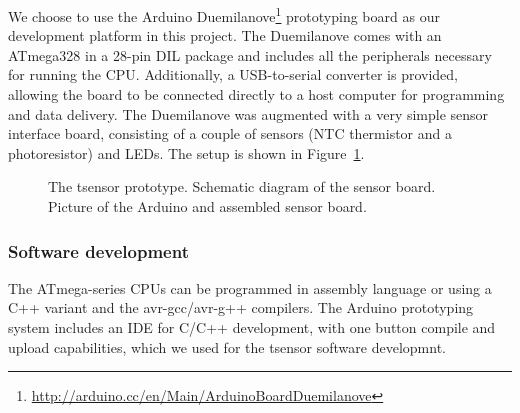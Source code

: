 We choose to use the Arduino Duemilanove\footnote{\url{http://arduino.cc/en/Main/ArduinoBoardDuemilanove}} prototyping board as our development platform in this project. The Duemilanove comes with an ATmega328 in a  28-pin DIL package and includes all the peripherals necessary for running the CPU. Additionally, a USB-to-serial converter is provided, allowing the board to be connected directly to a host computer for programming and data delivery.
%
The Duemilanove was augmented with a very simple sensor interface board, consisting of a couple of sensors (NTC thermistor and a photoresistor) and LEDs. The setup is shown in Figure~\ref{fig:tsensor}.
%

\begin{figure}[!t]
\centerline{
} 
\caption{The tsensor prototype. 
 Schematic diagram of the sensor board. 
 Picture of the Arduino and assembled sensor board.}
\label{fig:tsensor}
\end{figure}

\subsubsection{Software development} 
\label{tsensor-sdev}

The ATmega-series CPUs can be programmed in assembly language or using a C++ variant and the avr-gcc/avr-g++ compilers. The Arduino prototyping system includes an IDE for C/C++ development, with one button compile and upload capabilities, which we used for the tsensor software developmnt.

